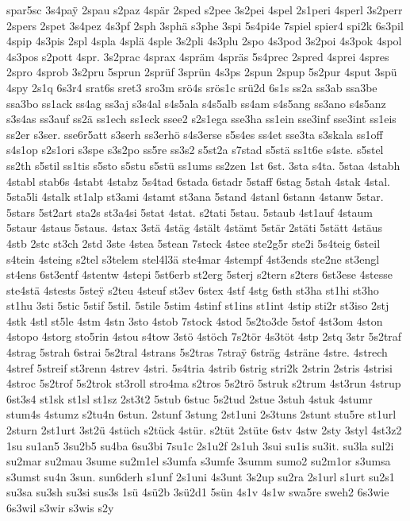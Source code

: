 {spar5sc
3s4pa^^ff
2spau
s2paz
4spär
2sped
s2pee
3s2pei
4spel
2s1peri
4sperl
3s2perr
2spers
2spet
3s4pez
4s3pf
2sph
3sphä
s3phe
3spi
5s4pi4e
7spiel
spier4
spi2k
6s3pil
4spip
4s3pis
2spl
4spla
4splä
4sple
3s2pli
4s3plu
2spo
4s3pod
3s2poi
4s3pok
4spol
4s3pos
s2pott
4spr.
3s2prac
4sprax
4spräm
4spräs
5s4prec
2spred
4sprei
4spres
2spro
4sprob
3s2pru
5sprun
2sprüf
3sprün
4s3ps
2spun
2spup
5s2pur
4sput
3spü
4spy
2s1q
6s3r4
srat6s
sret3
sro3m
srö4s
srös1c
srü2d
6s1s
ss2a
ss3ab
ssa3be
ssa3bo
ss1ack
ss4ag
ss3aj
s3s4al
s4s5ala
s4s5alb
ss4am
s4s5ang
ss3ano
s4s5anz
s3s4as
ss3auf
ss2ä
ss1ech
ss1eck
ssee2
s2s1ega
sse3ha
ss1ein
sse3inf
sse3int
ss1eis
ss2er
s3ser.
sse6r5att
s3serh
ss3erhö
s4s3erse
s5s4es
ss4et
sse3ta
s3skala
ss1off
s4s1op
s2s1ori
s3spe
s3s2po
ss5re
ss3s2
s5st2a
s7stad
s5stä
ss1t6e
s4ste.
s5stel
ss2th
s5stil
ss1tis
s5sto
s5stu
s5stü
ss1ums
ss2zen
1st
6st.
3sta
s4ta.
5staa
4stabh
4stabl
stab6s
4stabt
4stabz
5s4tad
6stada
6stadr
5staff
6stag
5stah
4stak
4stal.
5sta5li
4stalk
st1alp
st3ami
4stamt
st3ana
5stand
4stanl
6stann
4stanw
5star.
5stars
5st2art
sta2s
st3a4si
5stat
4stat.
s2tati
5stau.
5staub
4st1auf
4staum
5staur
4staus
5staus.
4stax
3stä
4stäg
4stält
4stämt
5stär
2stäti
5stätt
4stäus
4stb
2stc
st3ch
2std
3ste
4stea
5stean
7steck
4stee
ste2g5r
ste2i
5s4teig
6steil
s4tein
4steing
s2tel
s3telem
stel4l3ä
ste4mar
4stempf
4st3ends
ste2ne
st3engl
st4ens
6st3entf
4stentw
4stepi
5st6erb
st2erg
5sterj
s2tern
s2ters
6st3ese
4stesse
ste4stä
4stests
5ste^^ff
s2teu
4steuf
st3ev
6stex
4stf
4stg
6sth
st3ha
st1hi
st3ho
st1hu
3sti
5stic
5stif
5stil.
5stile
5stim
4stinf
st1ins
st1int
4stip
sti2r
st3iso
2stj
4stk
4stl
st5le
4stm
4stn
3sto
4stob
7stock
4stod
5s2to3de
5stof
4st3om
4ston
4stopo
4storg
sto5rin
4stou
s4tow
3stö
4stöch
7s2tör
4s3töt
4stp
2stq
3str
5s2traf
4strag
5strah
6strai
5s2tral
4strans
5s2tras
7stra^^ff
6sträg
4sträne
4stre.
4strech
4stref
5streif
st3renn
4strev
4stri.
5s4tria
4strib
6strig
stri2k
2strin
2stris
4strisi
4stroc
5s2trof
5s2trok
st3roll
stro4ma
s2tros
5s2trö
5struk
s2trum
4st3run
4strup
6st3s4
st1sk
st1sl
st1sz
2st3t2
5stub
6stuc
5s2tud
2stue
3stuh
4stuk
4stumr
stum4s
4stumz
s2tu4n
6stun.
2stunf
3stung
2st1uni
2s3tuns
2stunt
stu5re
st1url
2sturn
2st1urt
3st2ü
4stüch
s2tück
4stür.
s2tüt
2stüte
6stv
4stw
2sty
3styl
4st3z2
1su
su1an5
3su2b5
su4ba
6su3bi
7su1c
2s1u2f
2s1uh
3sui
su1is
su3it.
su3la
sul2i
su2mar
su2mau
3sume
su2m1el
s3umfa
s3umfe
3summ
sumo2
su2m1or
s3umsa
s3umst
su4n
3sun.
sun6derh
s1unf
2s1uni
4s3unt
3s2up
su2ra
2s1url
s1urt
su2s1
su3sa
su3sh
su3si
sus3s
1sü
4sü2b
3sü2d1
5sün
4s1v
4s1w
swa5re
sweh2
6s3wie
6s3wil
s3wir
s3wis
s2y
}
